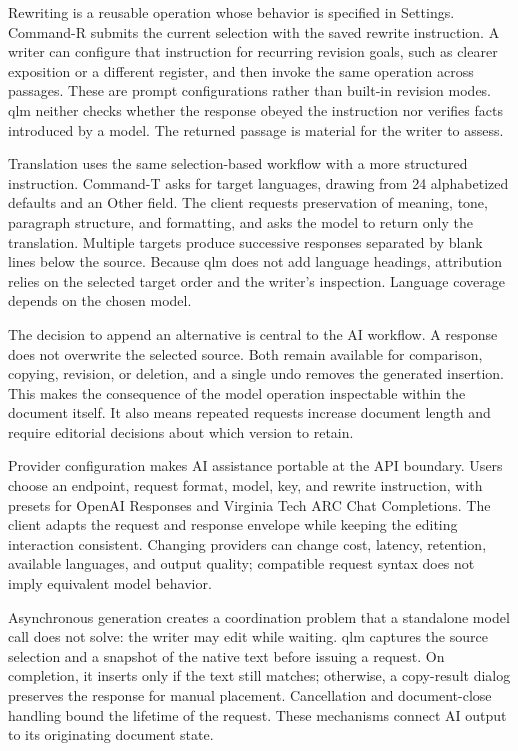 \documentclass[manuscript,screen,nonacm]{acmart}
\begin{document}
Rewriting is a reusable operation whose behavior is specified in Settings. Command-R submits the current selection with the saved rewrite instruction. A writer can configure that instruction for recurring revision goals, such as clearer exposition or a different register, and then invoke the same operation across passages. These are prompt configurations rather than built-in revision modes. qlm neither checks whether the response obeyed the instruction nor verifies facts introduced by a model. The returned passage is material for the writer to assess.

Translation uses the same selection-based workflow with a more structured instruction. Command-T asks for target languages, drawing from 24 alphabetized defaults and an Other field. The client requests preservation of meaning, tone, paragraph structure, and formatting, and asks the model to return only the translation. Multiple targets produce successive responses separated by blank lines below the source. Because qlm does not add language headings, attribution relies on the selected target order and the writer's inspection. Language coverage depends on the chosen model.

The decision to append an alternative is central to the AI workflow. A response does not overwrite the selected source. Both remain available for comparison, copying, revision, or deletion, and a single undo removes the generated insertion. This makes the consequence of the model operation inspectable within the document itself. It also means repeated requests increase document length and require editorial decisions about which version to retain.

Provider configuration makes AI assistance portable at the API boundary. Users choose an endpoint, request format, model, key, and rewrite instruction, with presets for OpenAI Responses and Virginia Tech ARC Chat Completions. The client adapts the request and response envelope while keeping the editing interaction consistent. Changing providers can change cost, latency, retention, available languages, and output quality; compatible request syntax does not imply equivalent model behavior.

Asynchronous generation creates a coordination problem that a standalone model call does not solve: the writer may edit while waiting. qlm captures the source selection and a snapshot of the native text before issuing a request. On completion, it inserts only if the text still matches; otherwise, a copy-result dialog preserves the response for manual placement. Cancellation and document-close handling bound the lifetime of the request. These mechanisms connect AI output to its originating document state.
\end{document}

